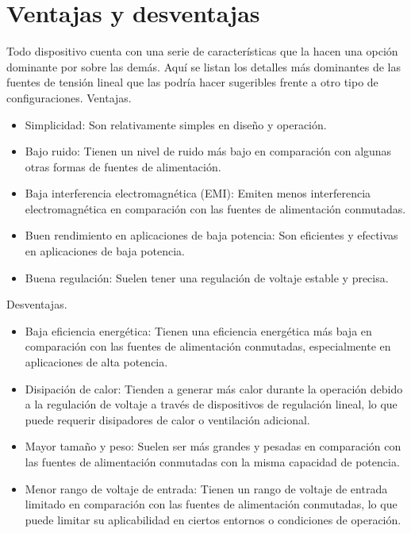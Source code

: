 \section{Ventajas y desventajas}
Todo dispositivo cuenta con una serie de características que la hacen una opción dominante por sobre las demás. Aquí se listan los detalles más dominantes de las fuentes de tensión lineal que las podría hacer sugeribles frente a otro tipo de configuraciones.
Ventajas.
\begin{itemize}
    \item Simplicidad: Son relativamente simples en diseño y operación.
    \item Bajo ruido: Tienen un nivel de ruido más bajo en comparación con algunas otras formas de fuentes de alimentación.
    \item Baja interferencia electromagnética (EMI): Emiten menos interferencia electromagnética en comparación con las fuentes de alimentación conmutadas.
    \item Buen rendimiento en aplicaciones de baja potencia: Son eficientes y efectivas en aplicaciones de baja potencia.
    \item Buena regulación: Suelen tener una regulación de voltaje estable y precisa.
\end{itemize}
Desventajas.
\begin{itemize}
    \item Baja eficiencia energética: Tienen una eficiencia energética más baja en comparación con las fuentes de alimentación conmutadas, especialmente en aplicaciones de alta potencia.
    \item Disipación de calor: Tienden a generar más calor durante la operación debido a la regulación de voltaje a través de dispositivos de regulación lineal, lo que puede requerir disipadores de calor o ventilación adicional.
    \item Mayor tamaño y peso: Suelen ser más grandes y pesadas en comparación con las fuentes de alimentación conmutadas con la misma capacidad de potencia.
    \item Menor rango de voltaje de entrada: Tienen un rango de voltaje de entrada limitado en comparación con las fuentes de alimentación conmutadas, lo que puede limitar su aplicabilidad en ciertos entornos o condiciones de operación.
\end{itemize}

